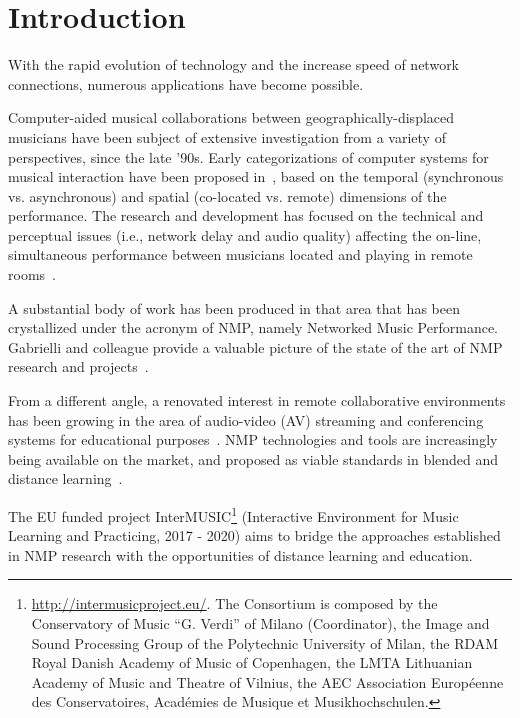 
\section{Introduction}\label{sec:introduction}
With the rapid evolution of technology and the increase speed of network connections, numerous applications have become possible.  

Computer-aided musical collaborations between geogra\-phically-displaced musicians have been subject of extensive investigation from a variety of perspectives, since the late '90s. Early categorizations of computer systems for musical interaction have been proposed in~\cite{barbosa2003displaced}, based on the temporal (synchronous vs. asynchronous) and spatial (co-located vs. remote) dimensions of the %
performance. 
The research and development has focused 
on the technical and perceptual issues (i.e., network delay and audio quality) affecting the on-line, simultaneous performance between musicians located and playing in remote rooms~\cite{rottondi2016overview}. 

A substantial body of work has been produced in that area that has been crystallized under the acronym of NMP, namely Networked Music Performance. Gabrielli and colleague provide a valuable picture of the state of the art of NMP research and projects~\cite[Chapter~2, 3]{gabrielli2016networked}.

From a different angle, a renovated interest in remote collaborative environments has been growing in the area of audio-video (AV) streaming and conferencing systems for educational purposes~\cite{alpiste2013telepresence}. NMP technologies and tools are increasingly being available on the market, and proposed as viable standards in blended and distance learning~\cite{IorwerthNMP2015}. 

The EU funded project InterMUSIC\footnote{\url{http://intermusicproject.eu/}. The Consortium is composed by the Conservatory of Music ``G. Verdi'' of Milano (Coordinator), the Image and Sound Processing Group of the Polytechnic University of Milan, the RDAM Royal Danish Academy of Music of Copenhagen, the LMTA Lithuanian Academy of Music and Theatre of Vilnius, the AEC Association Europ{\'e}enne des Conservatoires, Acad{\'e}mies de Musique et Musikhochschulen.} (Interactive Environment for Music Learning and Practicing, 2017 - 2020) aims to bridge the approaches established in NMP research with the opportunities of distance learning and education. 

